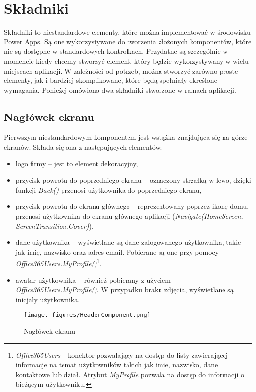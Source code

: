 \section{Składniki}
Składniki to niestandardowe elementy, które można implementować w środowisku Power Apps. Są one wykorzystywane do tworzenia złożonych komponentów, które nie są dostępne w standardowych kontrolkach. Przydatne są szczególnie w momencie kiedy chcemy stworzyć element, który będzie wykorzystywany w wielu miejscach aplikacji. W zależności od potrzeb, można stworzyć zarówno proste elementy, jak i bardziej skomplikowane, które będą spełniały określone wymagania. Ponieżej omówiono dwa składniki stworzone w ramach aplikacji.

\subsection{Nagłówek ekranu}
Pierwszym niestandardowym komponentem jest wstążka znajdująca się na górze ekranów. Składa się ona z następujących elementów:
\begin{itemize}
    \item logo firmy -- jest to element dekoracyjny,
    \item przycisk powrotu do poprzedniego ekranu -- oznaczony strzałką w lewo, dzięki funkcji \textit{Back()} przenosi użytkownika do poprzedniego ekranu,
    \item przycisk powrotu do ekranu głównego -- reprezentowany poprzez ikonę domu, przenosi użytkownika do ekranu głównego aplikacji (\emph{Navigate(HomeScreen, ScreenTransition.Cover)}),
    \item dane użytkownika -- wyświetlane są dane zalogowanego użytkownika, takie jak imię, nazwisko oraz adres email. Pobierane są one przy pomocy \emph{Office365Users.MyProfile()}\footnote{\emph{Office365Users} -- konektor pozwalający na dostęp do listy zawierającej informacje na temat użytkowników takich jak imie, nazwisko, dane kontaktowe lub dział. Atrybut \emph{MyProfile} pozwala na dostęp do informacji o bieżącym użytkowniku.}.
    \item awatar użytkownika -- również pobierany z użyciem \emph{Office365Users.MyProfile()}. W przypadku braku zdjęcia, wyświetlane są inicjały użytkownika.
\end{itemize}



\begin{figure}[H]
    \centering
    \texttt{[image: figures/HeaderComponent.png]}
    \caption{Nagłówek ekranu}
    \label{fig:headercomponent}
\end{figure}


